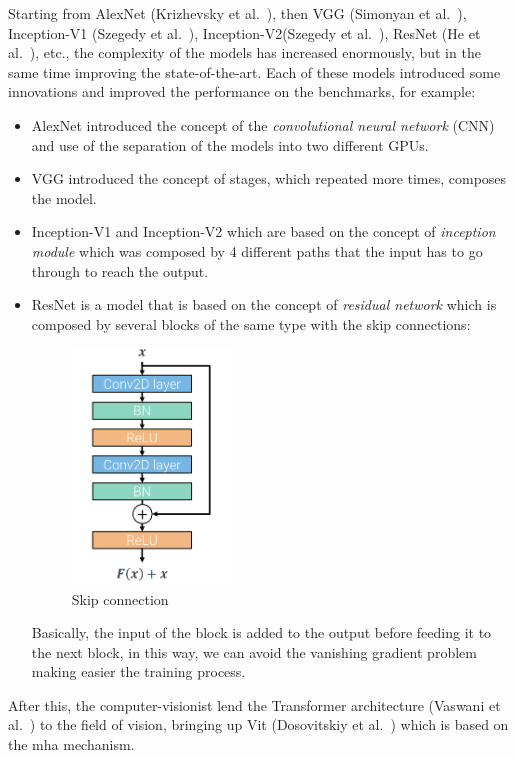 Starting from AlexNet (Krizhevsky et al.~\cite{alex_net_paper}), then VGG (Simonyan et al.~\cite{vgg_paper}), Inception-V1 (Szegedy et al.~\cite{inception_v1_paper}), Inception-V2(Szegedy et al.~\cite{inception_v2_paper}), ResNet (He et al.~\cite{resnet_paper}), etc., the complexity of the models has increased enormously, but in the same time improving the state-of-the-art.
Each of these models introduced some innovations and improved the performance on the benchmarks, for example:
\begin{itemize}
    \item AlexNet introduced the concept of the \emph{convolutional neural network} (CNN) and use of the separation of the models into two different GPUs.
    \item VGG introduced the concept of stages, which repeated more times, composes the model.
    \item Inception-V1 and Inception-V2 which are based on the concept of \emph{inception module} which was composed by 4 different paths that the input has to go through to reach the output.
    \item ResNet is a model that is based on the concept of \emph{residual network} which is composed by several blocks of the same type with the skip connections:
    \begin{figure}[H]
        \centering
        \includegraphics[width=0.4\textwidth]{images/1_1_skip_connection}
        \caption{Skip connection}\label{fig:skip-connection}
    \end{figure}
    Basically, the input of the block is added to the output before feeding it to the next block, in this way, we can avoid the \gls{vanishing gradient problem} making easier the training process.
\end{itemize}
After this, the computer-visionist lend the Transformer architecture (Vaswani et al.~\cite{transformer_paper}) to the field of vision, bringing up Vit (Dosovitskiy et al.~\cite{vit_paper}) which is based on the \gls{mha} mechanism.